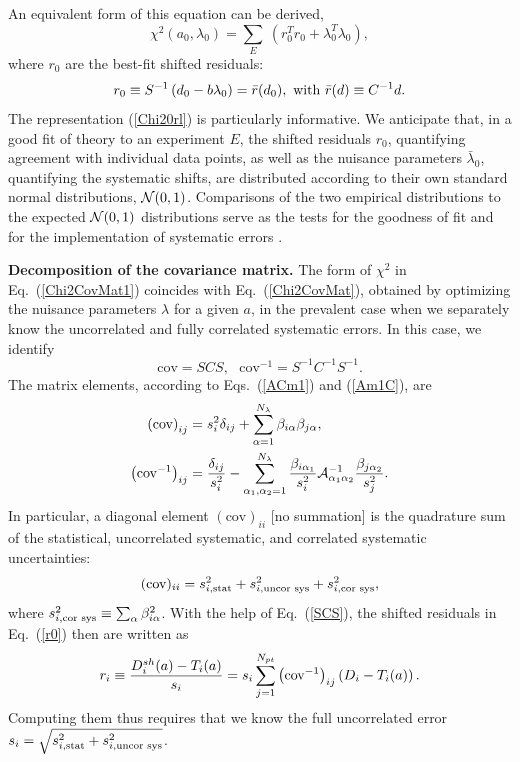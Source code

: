An equivalent form of this equation can be derived,
\begin{equation}
\chi^{2}(a_{0},\lambda_{0})=\sum_{E}\ \left(r_{0}^{T}r_{0}+\lambda_{0}^{T}\lambda_{0}\right),\label{Chi20rl}
\end{equation}
where $r_{0}$ are the best-fit shifted residuals:
\begin{equation}
r_{0}\equiv S^{-1}\left(d_{0}-b\lambda_{0}\right)=\bar{r}(d_{0}),\mbox{~with~}\bar{r}(d)\equiv C^{-1}d.\label{r0}
\end{equation}
The representation (\ref{Chi20rl}) is particularly informative. We
anticipate that, in a good fit of theory to an experiment $E$, the
shifted residuals $r_{0}$, quantifying agreement with individual
data points, as well as the nuisance parameters $\bar{\lambda}_{0}$,
quantifying the systematic shifts, are distributed according to their
own standard normal distributions, ${\cal N}(0,1)$. Comparisons of
the two empirical distributions to the expected ${\cal N}(0,1)$ distributions
serve as the tests for the goodness of fit and for the implementation
of systematic errors \cite{Kovarik:2019xvh}.

{\bf Decomposition of the covariance matrix.}
The form of $\chi^2$ in Eq.~(\ref{Chi2CovMat1}) coincides with Eq.~(\ref{Chi2CovMat}),
obtained by optimizing the nuisance parameters $\lambda$ for a given $a$, in the prevalent
case when we separately know the uncorrelated and fully correlated
systematic errors. In this case, we identify
\begin{equation}
\mbox{cov}=SCS,~~~\mbox{cov}^{-1}=S^{-1}C^{-1}S^{-1}.\label{SCS}
\end{equation}
 The matrix elements, according to Eqs.~(\ref{ACm1}) and (\ref{Am1C}),
are
\begin{align}
\left(\mbox{cov}\right)_{ij} & =s_{i}^{2}\delta_{ij}+\sum_{\alpha=1}^{N_{\lambda}}\beta_{i\alpha}\beta_{j\alpha},\label{cov}\\
\left(\mbox{\mbox{cov}}^{-1}\right)_{ij} & =\frac{\delta_{ij}}{s_{i}^{2}}-\sum_{\alpha_1,\alpha_2=1}^{N_{\lambda}}\frac{\beta_{i\alpha_1}}{s_{i}^{2}}{\cal {\cal A}}_{\alpha_1\alpha_2}^{-1}\frac{\beta_{j\alpha_2}}{s_{j}^{2}}.\label{covm1}
\end{align}
In particular, a diagonal element $(\mbox{cov})_{ii}$ {[}no summation{]}
is the quadrature sum of the statistical, uncorrelated systematic,
and correlated systematic uncertainties:
\begin{equation}
(\mbox{cov})_{ii}=s_{i,\mbox{\scriptsize stat}}^{2}+s_{i,\mbox{\scriptsize uncor sys}}^{2}+s_{i,\mbox{\scriptsize cor sys}}^{2},\label{s2i}
\end{equation}
where $s_{i,\mbox{\scriptsize cor sys}}^{2}\equiv\sum_{\alpha}\beta_{i\alpha}^{2}$.
With the help of Eq.~(\ref{SCS}), the shifted residuals in Eq.~(\ref{r0})
then are written as
\begin{equation}
r_{i}\equiv\frac{D_{i}^{sh}(a)-T_{i}(a)}{s_{i}}=s_{i}\sum_{j=1}^{N_{pt}}\left(\mbox{\mbox{cov}}^{-1}\right)_{ij}\left(D_{i}-T_{i}(a)\right).\label{ricov}
\end{equation}
Computing them thus requires that we know the full uncorrelated error $s_{i}=\sqrt{s_{i,\mbox{\scriptsize stat}}^{2}+s_{i,\mbox{\scriptsize uncor sys}}^{2}}$.


